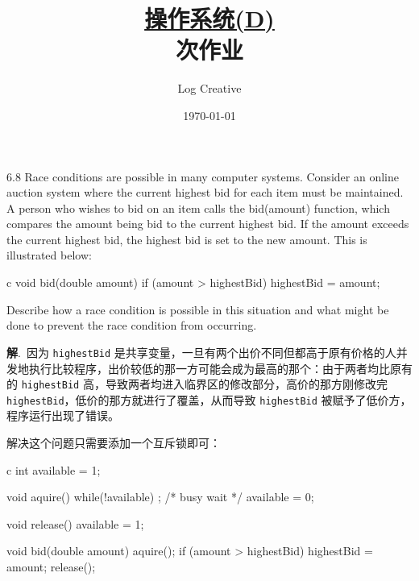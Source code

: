 \documentclass[12pt,a4paper]{article}
\newenvironment{problems}{\begin{list}{}{\renewcommand{\makelabel}[1]{\textbf{##1}\hfil}}}{\end{list}}
\providecommand{\sol}{\textbf{解}.~}
\begin{document}
\title{\normalsize \underline{操作系统(D)}\\ 次作业}
\author{Log Creative }
\date{\today}
\maketitle

\begin{problems}
    \item[6.8] Race conditions are possible in many computer systems. Consider an online auction system where the current highest bid for each item must be maintained. A person who wishes to bid on an item calls the bid(amount) function, which compares the amount being bid to the current highest bid. If the amount exceeds the current highest bid, the highest bid is set to the new amount. This is illustrated below:
    \begin{code}{c}
        void bid(double amount){
            if (amount > highestBid)      
                highestBid = amount;
        }
    \end{code} 
    Describe how a race condition is possible in this situation and what might be done to prevent the race condition from occurring.

    \sol 因为 \verb"highestBid" 是共享变量，一旦有两个出价不同但都高于原有价格的人并发地执行比较程序，出价较低的那一方可能会成为最高的那个：由于两者均比原有的 \verb"highestBid" 高，导致两者均进入临界区的修改部分，高价的那方刚修改完 \verb"highestBid"，低价的那方就进行了覆盖，从而导致 \verb"highestBid" 被赋予了低价方，程序运行出现了错误。

    解决这个问题只需要添加一个互斥锁即可：
    \begin{code}{c}
        int available = 1;

        void aquire(){
            while(!available)
                ;   /* busy wait */
            available = 0;
        }

        void release(){
            available = 1;
        }

        void bid(double amount){
            aquire();
            if (amount > highestBid)      
                highestBid = amount;
            release();
        }
    \end{code}


\end{problems}
\end{document}
